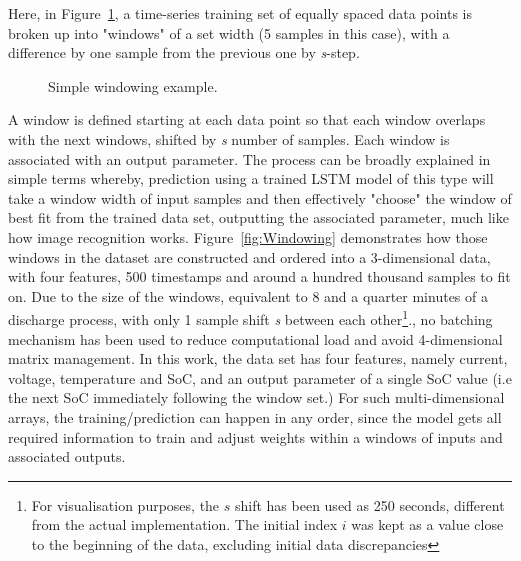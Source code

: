 %
%
Here, in Figure~\ref{fig:windowing_simple}, a time-series training set of equally spaced data points is broken up into "windows" of a set width (5 samples in this case), with a difference by one sample from the previous one by \textit{s}-step.
\begin{figure}[hbp]
    \centering
    
    \caption{Simple windowing example.}
    \label{fig:windowing_simple}
\end{figure}
A window is defined starting at each data point so that each window overlaps with the next windows, shifted by \textit{s} number of samples.
Each window is associated with an output parameter.
The process can be broadly explained in simple terms whereby, prediction using a trained LSTM model of this type will take a window width of input samples and then effectively "choose" the window of best fit from the trained data set, outputting the associated parameter, much like how image recognition works.
\mbox{Figure~\ref{fig:Windowing}} demonstrates how those windows in the dataset are constructed and ordered into a 3-dimensional data, with four features, 500 timestamps and around a hundred thousand samples to fit on.
Due to the size of the windows, equivalent to 8 and a quarter minutes of a discharge process, with only 1 sample shift \textit{s} between each other\footnote{For visualisation purposes, the $s$ shift has been used as 250 seconds, different from the actual implementation. The initial index $i$ was kept as a value close to the beginning of the data, excluding initial data discrepancies}., no batching mechanism has been used to reduce computational load and avoid 4-dimensional matrix management.
In this work, the data set has four features, namely current, voltage, temperature and SoC, and an output parameter of a single SoC value (i.e the next SoC immediately following the window set.)
For such multi-dimensional arrays, the training/prediction can happen in any order, since the model gets all required information to train and adjust weights within a windows of inputs and associated outputs.


